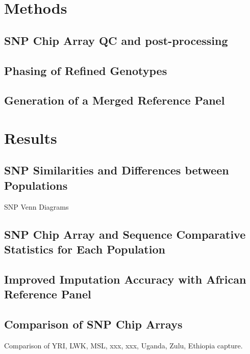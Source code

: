 \section{Methods}
\subsection{SNP Chip Array QC and post-processing}
\subsection{Phasing of Refined Genotypes}
\subsection{Generation of a Merged Reference Panel}
\section{Results}
\subsection{SNP Similarities and Differences between Populations}
SNP Venn Diagrams
\subsection{SNP Chip Array and Sequence Comparative Statistics for Each Population}
\subsection{Improved Imputation Accuracy with African Reference Panel}
\subsection{Comparison of SNP Chip Arrays}
Comparison of YRI, LWK, MSL, xxx, xxx, Uganda, Zulu, Ethiopia capture.

